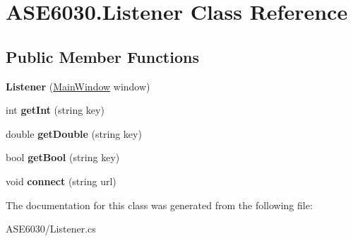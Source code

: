 \hypertarget{class_a_s_e6030_1_1_listener}{}\section{A\+S\+E6030.\+Listener Class Reference}
\label{class_a_s_e6030_1_1_listener}
\subsection*{Public Member Functions}
\begin{DoxyCompactItemize}
\item 
\mbox{\label{class_a_s_e6030_1_1_listener_af7626538cc99c4945ea517dbf6eaa249}} 
{\bfseries Listener} (\hyperlink{class_a_s_e6030_1_1_main_window}{Main\+Window} window)
\item 
\mbox{\label{class_a_s_e6030_1_1_listener_a7f82d12db6e97dd86f78dc2f62b23214}} 
int {\bfseries get\+Int} (string key)
\item 
\mbox{\label{class_a_s_e6030_1_1_listener_af8474a0fcd293043899a51cbb3e05d44}} 
double {\bfseries get\+Double} (string key)
\item 
\mbox{\label{class_a_s_e6030_1_1_listener_ac6b8dbf1ed6fd6c3ce0911beef9759ce}} 
bool {\bfseries get\+Bool} (string key)
\item 
\mbox{\label{class_a_s_e6030_1_1_listener_a8da1c65da8448e79897a2c06c31e6ca0}} 
void {\bfseries connect} (string url)
\end{DoxyCompactItemize}


The documentation for this class was generated from the following file\+:\begin{DoxyCompactItemize}
\item 
A\+S\+E6030/Listener.\+cs\end{DoxyCompactItemize}
